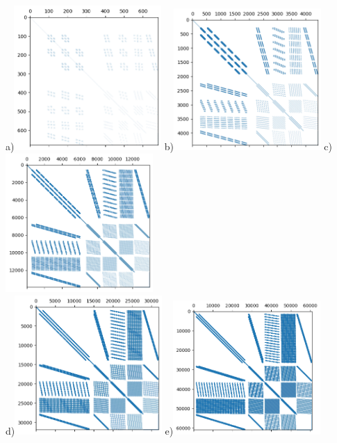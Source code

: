 \begin{center}
a)\includegraphics[width=5.6cm]{python_codes/fieldstone_81/results/matrix4}
b)\includegraphics[width=5.6cm]{python_codes/fieldstone_81/results/matrix8}
c)\includegraphics[width=5.6cm]{python_codes/fieldstone_81/results/matrix12}\\
d)\includegraphics[width=5.6cm]{python_codes/fieldstone_81/results/matrix16}
e)\includegraphics[width=5.6cm]{python_codes/fieldstone_81/results/matrix20}

\end{center}
